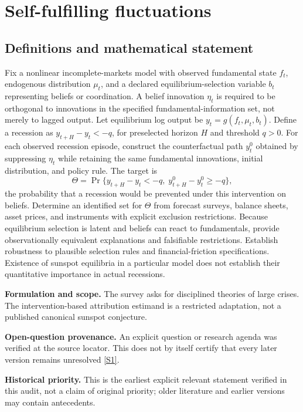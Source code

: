 \documentclass[11pt]{article}
\newcommand{\sref}[2]{\hyperlink{source:#1:#2}{[S#2]}}
\begin{document}
\section*{Self-fulfilling fluctuations}\label{30007516}
\subsection{Definitions and mathematical statement}
Fix a nonlinear incomplete-markets model with observed fundamental state \(f_t\), endogenous distribution \(\mu_t\), and a declared equilibrium-selection variable \(b_t\) representing beliefs or coordination. A belief innovation \(\eta_t\) is required to be orthogonal to innovations in the specified fundamental-information set, not merely to lagged output. Let equilibrium log output be \(y_t=g(f_t,\mu_t,b_t)\). Define a recession as \(y_{t+H}-y_t<-q\), for preselected horizon \(H\) and threshold \(q>0\).
For each observed recession episode, construct the counterfactual path \(y^{0}_t\) obtained by suppressing \(\eta_t\) while retaining the same fundamental innovations, initial distribution, and policy rule. The target is
\[
\Theta=\Pr\{y_{t+H}-y_t<-q,\;
y^{0}_{t+H}-y^{0}_t\ge -q\},
\]
the probability that a recession would be prevented under this intervention on beliefs. Determine an identified set for \(\Theta\) from forecast surveys, balance sheets, asset prices, and instruments with explicit exclusion restrictions. Because equilibrium selection is latent and beliefs can react to fundamentals, provide observationally equivalent explanations and falsifiable restrictions. Establish robustness to plausible selection rules and financial-friction specifications. Existence of sunspot equilibria in a particular model does not establish their quantitative importance in actual recessions.

\par\textbf{Formulation and scope.} The survey asks for disciplined theories of large crises. The intervention-based attribution estimand is a restricted adaptation, not a published canonical sunspot conjecture.

\par\textbf{Open-question provenance.} An explicit question or research agenda was verified at the source locator. This does not by itself certify that every later version remains unresolved \sref{30007516}{1}.

\par\textbf{Historical priority.} This is the earliest explicit relevant statement verified in this audit, not a claim of original priority; older literature and earlier versions may contain antecedents.
\end{document}

